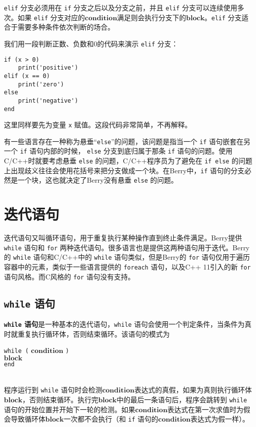 \texttt{elif} 分支必须用在 \texttt{if} 分支之后以及分支之前，并且 \texttt{elif} 分支可以连续使用多次。如果 \texttt{elif} 分支对应的$\bm{condition}$满足则会执行分支下的$\bm{block}$。\texttt{elif} 分支适合于需要多种条件依次判断的场合。

我们用一段判断正数、负数和0的代码来演示 \texttt{elif} 分支：
\begin{lstlisting}[language=berry, numbers=none]
if (x > 0)
    print('positive')
elif (x == 0)
    print('zero')
else
    print('negative')
end
\end{lstlisting}
这里同样要先为变量 \texttt{x} 赋值。这段代码非常简单，不再解释。

有一些语言存在一种称为悬垂``\texttt{else}''的问题，该问题是指当一个 \texttt{if} 语句嵌套在另一个 \texttt{if} 语句内部的时候， \texttt{else} 分支到底归属于那条 \texttt{if} 语句的问题。使用C/C++时就要考虑悬垂 \texttt{else} 的问题，C/C++程序员为了避免在 \texttt{if else} 的问题上出现歧义往往会使用花括号来把分支做成一个块。在Berry中，\texttt{if} 语句的分支必然是一个块，这也就决定了Berry没有悬垂 \texttt{else} 的问题。

\section{迭代语句}

迭代语句又叫循环语句，用于重复执行某种操作直到终止条件满足。Berry提供 \texttt{while} 语句和 \texttt{for} 两种迭代语句。很多语言也是提供这两种语句用于迭代。Berry的 \texttt{while} 语句和C/C++中的 \texttt{while} 语句类似，但是Berry的 \texttt{for} 语句仅用于遍历容器中的元素，类似于一些语言提供的 \texttt{foreach} 语句，以及C++ 11引入的新 \texttt{for} 语句风格。而C风格的 \texttt{for} 语句没有支持。

\subsection{\texttt{while} 语句}

\textbf{\texttt{while} 语句}是一种基本的迭代语句，\texttt{while} 语句会使用一个判定条件，当条件为真时就重复执行循环体，否则结束循环。该语句的模式为
\begin{algorithm}
    \texttt{while (} $\bm{condition}$ \texttt{)} \\
        \qquad $\bm{block}$ \\
    \texttt{end}
\end{algorithm}\vspace{-0.6em}\\
程序运行到 \texttt{while} 语句时会检测$\bm{condition}$表达式的真假，如果为真则执行循环体$\bm{block}$，否则结束循环。执行完$\bm{block}$中的最后一条语句后，程序会跳转到 \texttt{while} 语句的开始位置并开始下一轮的检测。如果$\bm{condition}$表达式在第一次求值时为假会导致循环体$\bm{block}$一次都不会执行（和 \texttt{if} 语句的$\bm{condition}$表达式为假一样）。

